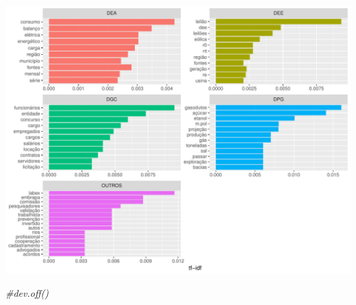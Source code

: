 \documentclass[]{article}
\newenvironment{Shaded}{\begin{snugshade}}{\end{snugshade}}
\newcommand{\CommentTok}[1]{\textcolor[rgb]{0.56,0.35,0.01}{\textit{#1}}}
\begin{document}
\includegraphics{markdown_v10_files/figure-latex/03_freq_palavras_dir_nostop-1.pdf}

\begin{Shaded}
\begin{Highlighting}[]
\CommentTok{#dev.off()}
\end{Highlighting}
\end{Shaded}
\end{document}
